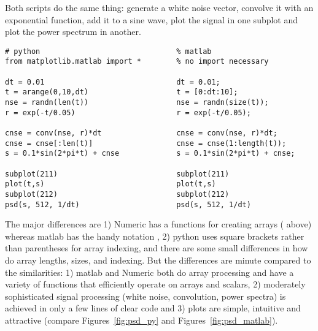 \documentclass[]{book}
\begin{document}

Both scripts do the same thing: generate a white noise vector,
convolve it with an exponential function, add it to a sine wave, plot
the signal in one subplot and plot the power spectrum in another.

\begin{lstlisting}[caption={matplotlib and matlab}, label=lst:versus_matlab]
# python                               % matlab
from matplotlib.matlab import *        % no import necessary

dt = 0.01                              dt = 0.01;
t = arange(0,10,dt)                    t = [0:dt:10];
nse = randn(len(t))                    nse = randn(size(t));
r = exp(-t/0.05)                       r = exp(-t/0.05);

cnse = conv(nse, r)*dt                 cnse = conv(nse, r)*dt;
cnse = cnse[:len(t)]                   cnse = cnse(1:length(t));
s = 0.1*sin(2*pi*t) + cnse             s = 0.1*sin(2*pi*t) + cnse;

subplot(211)                           subplot(211)
plot(t,s)                              plot(t,s)
subplot(212)                           subplot(212)
psd(s, 512, 1/dt)                      psd(s, 512, 1/dt)
\end{lstlisting}

The major differences are 1) Numeric has a functions for creating
arrays ( above) whereas matlab has the handy notation
\code{[0:dt:10]}, 2) python uses square brackets rather than
parentheses for array indexing, and there are some small differences
in how do array lengths, sizes, and indexing.  But the differences are
minute compared to the similarities: 1) matlab and Numeric both do
array processing and have a variety of functions that efficiently
operate on arrays and scalars, 2) moderately sophisticated signal
processing (white noise, convolution, power spectra) is achieved in
only a few lines of clear code and 3) plots are simple, intuitive and
attractive (compare Figures~\ref{fig:psd_py} and
Figures~\ref{fig:psd_matlab}).


\end{document}

